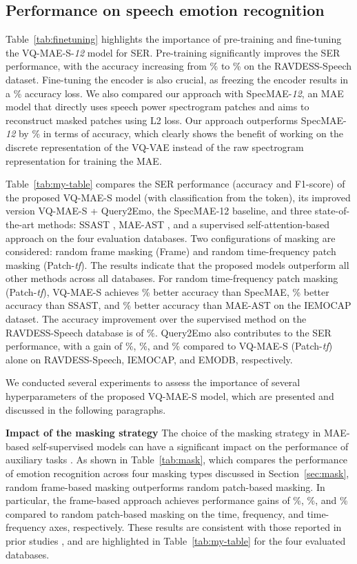 \documentclass{article}
\newcommand{\myparagraph}[1]{\noindent\textbf{#1}\hspace{.25cm}}
\begin{document}
\subsection{Performance on speech emotion recognition}
Table~\ref{tab:finetuning} highlights the importance of pre-training and fine-tuning the VQ-MAE-S-\emph{12} model for SER. Pre-training significantly improves the SER performance, with the accuracy increasing from \% to \% on the RAVDESS-Speech dataset. Fine-tuning the encoder is also crucial, as freezing the encoder results in a \% accuracy loss. We also compared our approach with SpecMAE-\emph{12}, an MAE model that directly uses speech power spectrogram patches and aims to reconstruct masked patches using L2 loss. Our approach outperforms SpecMAE-\emph{12} by \% in terms of accuracy, which clearly shows the benefit of working on the discrete representation of the VQ-VAE instead of the raw spectrogram representation for training the MAE.

Table~\ref{tab:my-table} compares the SER performance (accuracy and F1-score) of the proposed VQ-MAE-S model (with classification from the  token), its improved version VQ-MAE-S + Query2Emo, the SpecMAE-12 baseline, and three state-of-the-art methods: SSAST \cite{gong2022ssast}, MAE-AST \cite{baade2022mae}, and a supervised self-attention-based approach \cite{chumachenko2022self} on the four evaluation databases. Two configurations of masking are considered: random frame masking (Frame) and random time-frequency patch masking (Patch-\emph{tf}). The results indicate that the proposed models outperform all other methods across all databases.
For random time-frequency patch masking (Patch-\emph{tf}), VQ-MAE-S achieves \% better accuracy than SpecMAE, \% better accuracy than SSAST, and \% better accuracy than MAE-AST on the IEMOCAP dataset. The accuracy improvement over the supervised method on the RAVDESS-Speech database is of \%. Query2Emo also contributes to the SER performance, with a gain of \%, \%, and \% compared to VQ-MAE-S (Patch-\emph{tf}) alone on RAVDESS-Speech, IEMOCAP, and EMODB, respectively.

We conducted several experiments to assess the importance of several hyperparameters of the proposed VQ-MAE-S model, which are presented and discussed in the following paragraphs.

\myparagraph{Impact of the masking strategy} The choice of the masking strategy in MAE-based self-supervised models can have a significant impact on the performance of auxiliary tasks \cite{he2022masked}. As shown in Table~\ref{tab:mask}, which compares the performance of emotion recognition across four masking types discussed in Section~\ref{sec:mask}, random frame-based masking outperforms random patch-based masking. In particular, the frame-based approach achieves performance gains of \%, \%, and \% compared to random patch-based masking on the time, frequency, and time-frequency axes, respectively. These results are consistent with those reported in prior studies \cite{gong2022ssast, baade2022mae}, and are highlighted in Table~\ref{tab:my-table} for the four evaluated databases.
\end{document}
